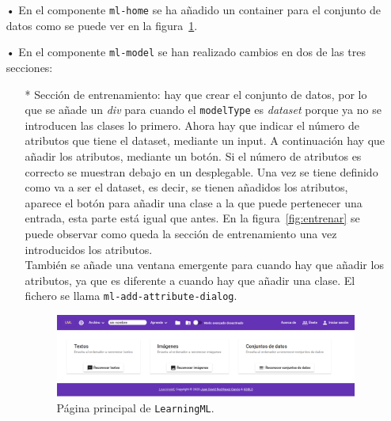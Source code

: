 \documentclass[a4paper, 12pt]{book}
\begin{document}
\begin{itemize}
	\item[•] En el componente \texttt{ml-home} se ha añadido un container para el conjunto de datos como se puede ver en la figura~\ref{fig:pagina_principal}.
	\item[•] En el componente \texttt{ml-model} se han realizado cambios en dos de las tres secciones:
	\begin{itemize}
		\item[*] Sección de entrenamiento: hay que crear el conjunto de datos, por lo que se añade un \emph{div} para cuando el \texttt{modelType} es \emph{dataset} porque ya no se introducen las clases lo primero. 
		Ahora hay que indicar el número de atributos que tiene el dataset, mediante un input. 
		A continuación hay que añadir los atributos, mediante un botón. 
		Si el número de atributos es correcto se muestran debajo en un desplegable. 
		Una vez se tiene definido como va a ser el dataset, es decir, se tienen añadidos los atributos, aparece el botón para añadir una clase a la que puede pertenecer una entrada, esta parte está igual que antes. 
		En la figura~\ref{fig:entrenar} se puede observar como queda la sección de entrenamiento una vez introducidos los atributos.\\
		También se añade una ventana emergente para cuando hay que añadir los atributos, ya que es diferente a cuando hay que añadir una clase. El fichero se llama \texttt{ml-add-attribute-dialog}.

\begin{figure}
	\centering 
	\includegraphics[width=13cm, keepaspectratio]{img/pag_principal.png}
	\caption{Página principal de \texttt{LearningML}.} \label{fig:pagina_principal}
\end{figure}


\end{itemize}
\end{itemize}
\end{document}
